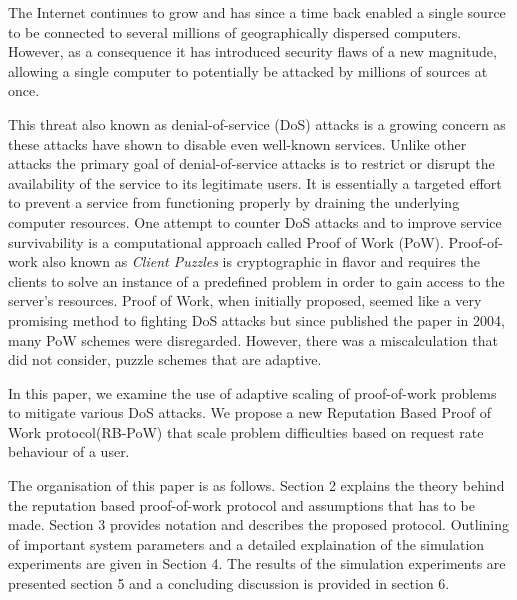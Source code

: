 The Internet continues to grow and has since a time back enabled a single source to be connected to several millions of geographically dispersed computers. However, as a consequence it has introduced security flaws of a new magnitude, allowing a single computer to potentially be attacked by millions of sources at once. 

This threat also known as denial-of-service (DoS) attacks is a growing concern as these attacks have shown to disable even well-known services. Unlike other attacks the primary goal of denial-of-service attacks is to restrict or disrupt the availability of the service to its legitimate users. It is essentially a targeted effort to prevent a service from functioning properly by draining the underlying computer resources. 
One attempt to counter DoS attacks and to improve service survivability is a computational approach called Proof of Work (PoW). Proof-of-work also known as \emph{Client Puzzles}\cite{dosauth, JuelsB99} is cryptographic in flavor and requires the clients to solve an instance of a predefined problem in order to gain access to the server’s resources. Proof of Work, when initially proposed, seemed like a very promising method to fighting DoS attacks but since \citeauthor{LaurieC04} published the paper  in 2004, many PoW schemes were disregarded. However, there was a miscalculation that \citeauthor{LaurieC04} did not consider, puzzle schemes that are adaptive\cite{Green,gunter}.

In this paper, we examine the use of adaptive scaling of proof-of-work problems to mitigate various DoS attacks. We propose a new Reputation Based Proof of Work protocol(RB-PoW) that scale problem difficulties based on request rate behaviour of a user.

The organisation of this paper is as follows. Section 2 explains the theory behind the reputation based proof-of-work protocol and assumptions that has to be made. Section 3 provides notation and describes the proposed protocol. Outlining of important system parameters and a detailed explaination of the simulation experiments are given in Section 4. The results of the simulation experiments are presented section 5 and a concluding discussion is provided in section 6.



